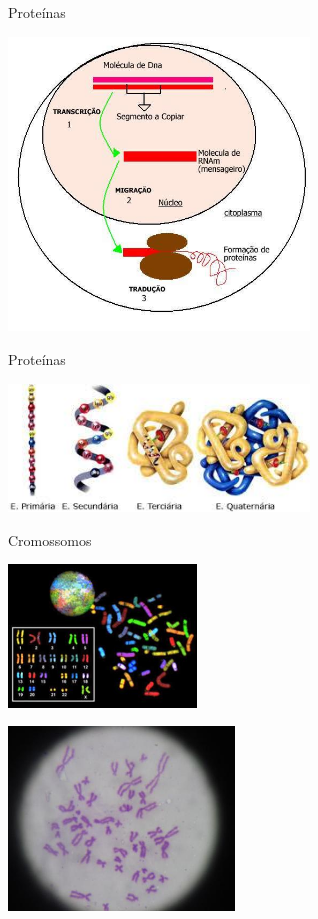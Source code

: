 \documentclass[]{beamer}
\begin{document}
  \begin{frame}{Proteínas}
    \begin{center}
      \includegraphics[width=8cm]{images/proteinas-1.png}
    \end{center}
  \end{frame}

  \begin{frame}{Proteínas}
    \begin{center}
      \includegraphics[width=8cm]{images/proteinas-2.png}
    \end{center}
  \end{frame}

  \begin{frame}{Cromossomos}
    \begin{center}
      \begin{multicols}{2}
        \includegraphics[width=5cm]{images/cromossomos-1.png}
        \columnbreak

        \includegraphics[width=6cm]{images/cromossomos-2.png}
      \end{multicols}
    \end{center}
  \end{frame}
\end{document}

